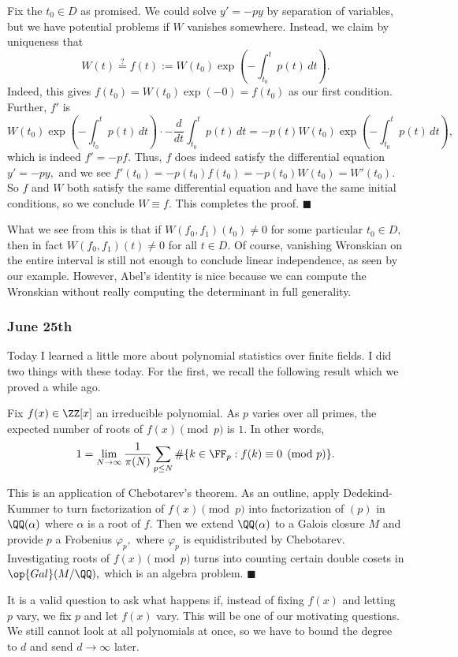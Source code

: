 Fix the $t_0\in D$ as promised. We could solve $y'=-py$ by separation of variables, but we have potential problems if $W$ vanishes somewhere. Instead, we claim by uniqueness that
\[W(t)\stackrel?=f(t):=W(t_0)\exp\left(-\int_{t_0}^tp(t)\,dt\right).\]
Indeed, this gives $f(t_0)=W(t_0)\exp(-0)=f(t_0)$ as our first condition. Further, $f'$ is
\[W(t_0)\exp\left(-\int_{t_0}^tp(t)\,dt\right)\cdot-\frac d{dt}\int_{t_0}^tp(t)\,dt=-p(t)W(t_0)\exp\left(-\int_{t_0}^tp(t)\,dt\right),\]
which is indeed $f'=-pf.$ Thus, $f$ does indeed satisfy the differential equation $y'=-py,$ and we see $f'(t_0)=-p(t_0)f(t_0)=-p(t_0)W(t_0)=W'(t_0).$ So $f$ and $W$ both satisfy the same differential equation and have the same initial conditions, so we conclude $W\equiv f.$ This completes the proof. $\blacksquare$

What we see from this is that if $W(f_0,f_1)(t_0)\ne0$ for some particular $t_0\in D,$ then in fact $W(f_0,f_1)(t)\ne0$ for all $t\in D.$ Of course, vanishing Wronskian on the entire interval is still not enough to conclude linear independence, as seen by our example. However, Abel's identity is nice because we can compute the Wronskian without really computing the determinant in full generality.

\subsubsection{June 25th}
Today I learned a little more about polynomial statistics over finite fields. I did two things with these today. For the first, we recall the following result which we proved a while ago.
\begin{theorem}
    Fix $f(x)\in\ZZ[x]$ an irreducible polynomial. As $p$ varies over all primes, the expected number of roots of $f(x)\pmod p$ is $1.$ In other words,
    \[1=\lim_{N\to\infty}\frac1{\pi(N)}\sum_{p\le N}\#\{k\in\FF_p:f(k)\equiv0\pmod p\}.\]
\end{theorem}
This is an application of Chebotarev's theorem. As an outline, apply Dedekind-Kummer to turn factorization of $f(x)\pmod p$ into factorization of $(p)$ in $\QQ(\alpha)$ where $\alpha$ is a root of $f.$ Then we extend $\QQ(\alpha)$ to a Galois closure $M$ and provide $p$ a Frobenius $\varphi_p,$ where $\varphi_p$ is equidistributed by Chebotarev. Investigating roots of $f(x)\pmod p$ turns into counting certain double cosets in $\op{Gal}(M/\QQ),$ which is an algebra problem. $\blacksquare$

It is a valid question to ask what happens if, instead of fixing $f(x)$ and letting $p$ vary, we fix $p$ and let $f(x)$ vary. This will be one of our motivating questions. We still cannot look at all polynomials at once, so we have to bound the degree to $d$ and send $d\to\infty$ later.

